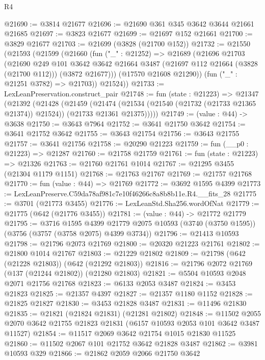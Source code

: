 \begin{lexlean}{R4}
\begin{coremodule}
@21690 := @3814 @21677
@21696 := @21690 @361 @345 @3642 @3644 @21661 @21685
@21697 := @3823 @21677
@21699 := @21697 @152 @21661
@21700 := @3829 @21677
@21703 := @21699 (@3828 (@21700 @152))
@21732 := @21550
    (@21593
      (@21599
        (@21660
          (fun ("_" : @21252) =>
          @21689
            (@21696
              @21703
              (@21690
                @249
                @101
                @3642
                @3642
                @21664
                @3487
                (@21697 @112 @21664 (@3828 (@21700 @112)))
                (@3872 @21677)))
            (@17570 @21608 @21290))
          (fun ("_" : @21251 @3782) => @21703))
        @21524))
@21733 := LexLeanPreservation.construct_pair
@21748 := fun (state : @21223) =>
  @21347
    (@21392
      (@21428
        (@21459
          (@21474
            (@21534 (@21540 (@21732 (@21733 @21365 @21374)) @21524))
            (@21733 @21361 @21375)))))
@21749 := (value : @44) -> @3638
@21750 := @3643 @7964
@21752 := @3641 @21750 @3642
@21754 := @3641 @21752 @3642
@21755 := @3643 @21754
@21756 := @3643 @21755
@21757 := @3641 @21756
@21758 := @20290 @21223
@21759 := fun (__p0 : @21223) => @21287
@21760 := @21758 @21759
@21761 := fun (state : @21223) => @21326
@21763 := @21760 @21761 @1014
@21767 := @21295 @3455 (@21304 @1179 @1151)
@21768 := @21763 @21767
@21769 := @21757 @21768
@21770 := fun (value : @44) => @21769
@21772 := @3692 @1595 @4399
@21773 := LexLeanPreserve.C59da78af981c7e10f46266c8a8b8b11e.R4.__fits_28
@21775 := @3701 (@21773 @3455)
@21776 := LexLeanStd.Sha256.wordOfNat
@21779 := @21775 (@642 (@21776 @3455))
@21781 := (value : @44) -> @21772 @21779
@21795 := @3716
    @1595
    @4399
    @21779
    @2075
    @10593
    (@3740 (@3750 @1595))
    (@3756 (@3757 (@3758 @2075) @4399 @3734))
@21796 := @21413 @10593
@21798 := @21796 @2073 @21769
@21800 := @20320 @21223 @21761
@21802 := @21800 @1014 @21767
@21803 := @21229 @21802
@21809 := @21798 (@642 (@21228 @21803)) (@642 (@21292 @21803))
@21816 := @21796 @2072 @21769 (@137 (@21244 @21802)) (@21280 @21803)
@21821 := @5504 @10593 @2048 @2071 @21756 @21768
@21823 := @6133 @2053 @3487
@21824 := @3453 @21823
@21825 := @21357 @4397
@21827 := @21357 @1180 @1152
@21828 := @21825 @21827
@21830 := @3453 @21828 @3487
@21831 := @11496 @21830
@21835 := @21821 (@21824 @21831) (@21281 @21802)
@21848 := @11502 @2055 @2070 @3642 @21755 @21823 @21831 (@6157 @10593 @2053 @101 @3642 @3487 @11527)
@21854 := @11517 @2069 @3642 @21754 @1015 @21830 @11525
@21860 := @11502 @2067 @101 @21752 @3642 @21828 @3487
@21862 := @3981 @10593 @329
@21866 := @21862 @2059 @2066 @21750 @3642

\end{coremodule}
\end{lexlean}
